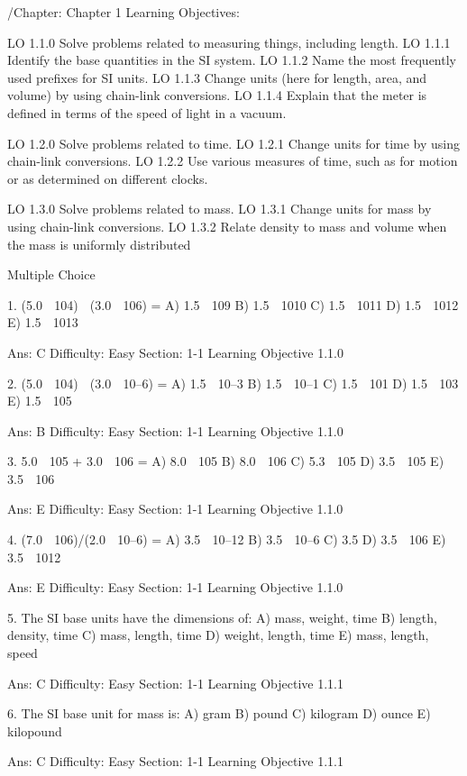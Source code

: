 /Chapter: Chapter 1
Learning Objectives:

LO 1.1.0 Solve problems related to measuring things, including length.
LO 1.1.1 Identify the base quantities in the SI system.
LO 1.1.2 Name the most frequently used prefixes for SI units.
LO 1.1.3 Change units (here for length, area, and volume) by using chain-link conversions.
LO 1.1.4 Explain that the meter is defined in terms of the speed of light in a vacuum.

LO 1.2.0 Solve problems related to time.
LO 1.2.1 Change units for time by using chain-link conversions.
LO 1.2.2 Use various measures of time, such as for motion or as determined on different clocks.

LO 1.3.0 Solve problems related to mass.
LO 1.3.1 Change units for mass by using chain-link conversions.
LO 1.3.2 Relate density to mass and volume when the mass is uniformly distributed

Multiple Choice

1.  (5.0  104)  (3.0  106) = 
A)  1.5  109
B)  1.5  1010
C)  1.5  1011
D)  1.5  1012
E)  1.5  1013

Ans:  C
Difficulty:  Easy
Section:  1-1
Learning Objective 1.1.0


2.  (5.0  104)  (3.0  10–6) = 
A)  1.5  10–3
B)  1.5  10–1
C)  1.5  101
D)  1.5  103
E)  1.5  105

Ans:  B
Difficulty:  Easy
Section:  1-1
Learning Objective 1.1.0



3.  5.0  105 + 3.0  106 = 
A)  8.0  105
B)  8.0  106
C)  5.3  105
D)  3.5  105
E)  3.5  106

Ans:  E
Difficulty:  Easy
Section:  1-1
Learning Objective 1.1.0


4.  (7.0  106)/(2.0  10–6) = 
A)  3.5  10–12
B)  3.5  10–6 
C)  3.5
D)  3.5  106
E)  3.5  1012

Ans:  E
Difficulty:  Easy
Section:  1-1
Learning Objective 1.1.0


5. The SI base units have the dimensions of:
A) mass, weight, time
B) length, density, time
C) mass, length, time
D) weight, length, time
E) mass, length, speed

Ans: C
Difficulty: Easy
Section: 1-1
Learning Objective 1.1.1

6.  The SI base unit for mass is: 
A)  gram 
B)  pound 
C)  kilogram 
D)  ounce 
E)  kilopound 



Ans:  C
Difficulty:  Easy
Section:  1-1
Learning Objective 1.1.1


